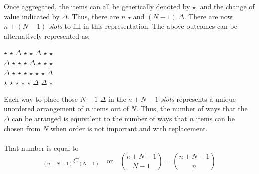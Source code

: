 \documentclass[12pt]{article}
\begin{document}
\begin{enumerate}
Once aggregated, the items can all be generically denoted by $\star$, and the change of value indicated by $\Delta$. Thus, there are $n$ $\star$ and $(N-1) \ \Delta$.
There are now $n + (N - 1)$ \textit{slots} to fill in this representation.
The above outcomes can be alternatively represented as:
\begin{center}
    \underline{$\star$} \quad \underline{$\star$} \quad \underline{$\Delta$} \quad \underline{$\star$} \quad \underline{$\star$} \quad \underline{$\Delta$} \quad \underline{$\star$} \quad \underline{$\star$}   
    \\
    \underline{$\Delta$} \quad \underline{$\star$} \quad \underline{$\star$} \quad \underline{$\star$} \quad \underline{$\Delta$} \quad \underline{$\star$} \quad \underline{$\star$} \quad \underline{$\star$} 
    \\
    \underline{$\Delta$} \quad \underline{$\star$} \quad \underline{$\star$} \quad \underline{$\star$} \quad \underline{$\star$} \quad \underline{$\star$} \quad \underline{$\star$} \quad \underline{$\Delta$}     
    \\
    \underline{$\star$} \quad \underline{$\star$} \quad \underline{$\star$} \quad \underline{$\star$} \quad \underline{$\star$} \quad \underline{$\Delta$} \quad \underline{$\Delta$} \quad \underline{$\star$}   
\end{center}
Each way to place those $N-1$ $\Delta$ in the $n + N -1$ \textit{slots} represents a unique unordered arrangement of $n$ items out of $N$.
Thus, the number of ways that the $\Delta$ can be arranged is equivalent to the number of ways that $n$ items can be chosen from $N$ when order is not important and with replacement.
\\\\
That number is equal to 
$$
_{(n + N - 1)} C_{(N - 1)} \quad \text{or} \quad \binom{n + N - 1}{N - 1} = \binom{n + N -1}{n}
$$


\end{enumerate}
\end{document}
